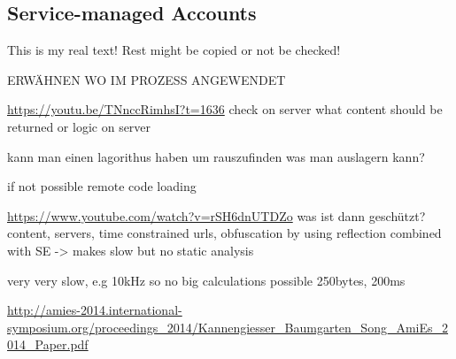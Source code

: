 \subsection{Service-managed Accounts} \label{subsection:external-service}
This is my real text! Rest might be copied or not be checked!

ERWÄHNEN WO IM PROZESS ANGEWENDET\newline


\url{https://youtu.be/TNnccRimhsI?t=1636}\newline
check on server what content should be returned or logic on server\newline

kann man einen lagorithus haben um rauszufinden was man auslagern kann?\newline

if not possible remote code loading\newline

\url{https://www.youtube.com/watch?v=rSH6dnUTDZo}
was ist dann geschützt? content, servers, time constrained urls, obfuscation by using reflection combined with SE -> makes slow but no static analysis\newline

very very slow, e.g 10kHz so no big calculations possible\newline
250bytes, 200ms \newline

\url{http://amies-2014.international-symposium.org/proceedings_2014/Kannengiesser_Baumgarten_Song_AmiEs_2014_Paper.pdf}\newline

